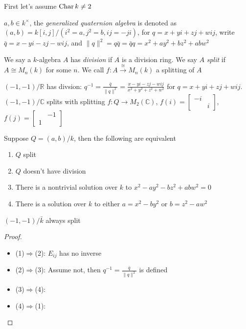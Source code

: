 \documentclass[a4paper,10pt]{article}
\begin{document}
First let's assume $\operatorname{Char} k\neq 2$

\begin{definition}
$a,b\in k^\times$, the \textit{generalized quaternion algebra} is denoted as $(a,b)=k[i,j]/(i^2=a,j^2=b,ij=-ji)$, for $q=x+yi+zj+wij$, write $\bar q=x-yi-zj-wij$, and $\|q\|^2=q\bar q=\bar qq=x^2+ay^2+bz^2+abw^2$
\end{definition}

\begin{definition}
We say a $k$-algebra $A$ has \textit{division} if $A$ is a division ring. We say $A$ \textit{split} if $A\cong M_n(k)$ for some $n$. We call $f:A\xrightarrow{\cong}M_n(k)$ a splitting of $A$
\end{definition}

\begin{example}
$(-1,-1)/\mathbb R$ has divsion: $q^{-1}=\frac{\bar q}{\|q\|^2}=\frac{x-yi-zj-wij}{x^2+y^2+z^2+w^2}$ for $q=x+yi+zj+wij$. $(-1,-1)/\mathbb C$ splits with splitting $f:Q\to M_2(\mathbb C)$, $f(i)=\begin{bmatrix}-i&\\&i\end{bmatrix}$, $f(j)=\begin{bmatrix}&-1\\1&\end{bmatrix}$
\end{example}

\begin{proposition}
Suppose $Q=(a,b)/k$, then the following are equivalent
\begin{enumerate}
\item $Q$ split
\item $Q$ doesn't have division
\item There is a nontrivial solution over $k$ to $x^2-ay^2-bz^2+abw^2=0$
\item There is a solution over $k$ to either $a=x^2-by^2$ or $b=z^2-aw^2$
\end{enumerate}
\end{proposition}

\begin{remark}
$(-1,-1)/\bar k$ always split
\end{remark}

\begin{proof}
\begin{itemize}
\item (1)$\Rightarrow$(2): $E_{ij}$ has no inverse
\item (2)$\Rightarrow$(3): Assume not, then $q^{-1}=\frac{\bar q}{\|q\|^2}$ is defined
\item (3)$\Rightarrow$(4): 
\item (4)$\Rightarrow$(1): 
\end{itemize}
\end{proof}
\end{document}
